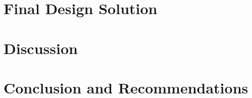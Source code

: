 \documentclass{article}
\begin{document}
\section{Final Design Solution}
\label{sec:final-design-solut}

\section{Discussion}
\label{sec:discussion}

\section{Conclusion and Recommendations}
\label{sec:concl-recomm}

\newpage
{}


\end{document}

